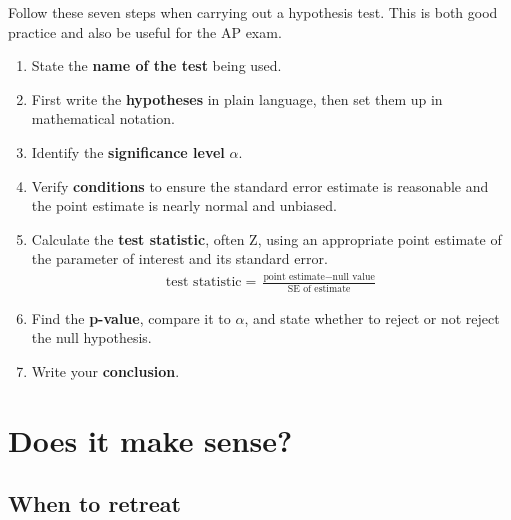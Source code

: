 \begin{termBox}{
Follow these seven steps when carrying out a hypothesis test. This is both good practice and also be useful for the AP exam.
\begin{enumerate}
\setlength{\itemsep}{0mm}
\item State the \textbf{name of the test} being used.
\item First write the \textbf{hypotheses} in plain language, then set them up in mathematical notation.
\item Identify the \textbf{significance level} $\alpha$.
\item Verify \textbf{conditions} to ensure the standard error estimate is reasonable and the point estimate is nearly normal and unbiased.
\item Calculate the \textbf{test statistic}, often Z, using an appropriate point estimate of the parameter of interest and its standard error.\vspace{-1.5mm}
\begin{align*}
\text{test statistic} = \frac{\text{point estimate} - \text{null value}}{\text{SE of estimate}}
\end{align*}
\item Find the \textbf{p-value}, compare it to $\alpha$, and state whether to reject or not reject the null hypothesis.
\item Write your \textbf{conclusion}.
\end{enumerate}}
\end{termBox}




\section{Does it make sense?}
\subsection{When to retreat}
\label{whenToRetreat}

